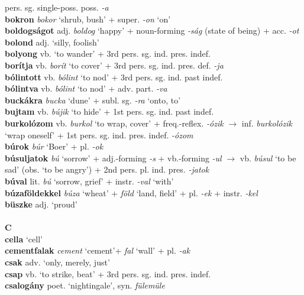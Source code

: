 \documentclass[11pt]{article}
\begin{document}
pers. sg. single\hyp{}poss. poss. \emph{-a} \\
\textbf{bokron} \emph{bokor} `shrub, bush' + super. \emph{-on} `on' \\
\textbf{boldogságot} adj. \emph{boldog} `happy' + noun\hyp{}forming
  \emph{-ság} (state of being) + acc. \emph{-ot} \\
\textbf{bolond} adj. `silly, foolish' \\
\textbf{bolyong} vb. `to wander' + 3rd pers. sg. ind. pres. indef. \\
\textbf{borítja} vb. \emph{borít} `to cover' + 3rd
pers. sg. ind. pres. def. \emph{-ja} \\
\textbf{bólintott} vb. \emph{bólint} `to nod' + 3rd
pers. sg. ind. past indef. \\
\textbf{bólintva}  vb. \emph{bólint} `to nod' + adv. part. \emph{-va} \\
\textbf{buckákra} \emph{bucka} `dune' + subl. sg. \emph{-ra} `onto, to' \\
\textbf{bujtam} vb. \emph{bújik} `to hide' + 1st pers. sg. ind. past
indef. \\
\textbf{burkolózom} vb. \emph{burkol} `to wrap, cover' +
freq.\hyp{}reflex. \emph{-ózik} $\rightarrow$ inf. \emph{burkolózik}
`wrap oneself' + 1st pers. sg. ind. pres. indef. \emph{-ózom} \\
\textbf{búrok} \emph{búr} `Boer' + pl. \emph{-ok} \\
\textbf{búsuljatok} \emph{bú} `sorrow' + adj.\hyp{}forming \emph{-s}
+ vb.\hyp{}forming \emph{-ul} $\rightarrow$ vb. \emph{búsul} `to be
sad' (obs. `to be angry') + 2nd pers. pl. ind. pres. \emph{-jatok} \\
\textbf{búval} lit. \emph{bú} `sorrow, grief' + instr. \emph{-val}
`with' \\
\textbf{búzaföldekkel} \emph{búza} `wheat' + \emph{föld} `land, field'
+ pl. \emph{-ek} + instr. \emph{-kel} \\
\textbf{büszke} adj. `proud' \\
\ \\
\noindent \textbf{\large C} \\
\textbf{cella} `cell' \\
\textbf{cementfalak} \emph{cement} `cement'+ \emph{fal} `wall' +
pl. \emph{-ak} \\
\textbf{csak} adv. `only, merely, just' \\
\textbf{csap} vb. `to strike, beat' + 3rd pers. sg. ind. pres. indef. \\
\textbf{csalogány} poet. `nightingale', syn. \emph{fülemüle} \\
\end{document}
